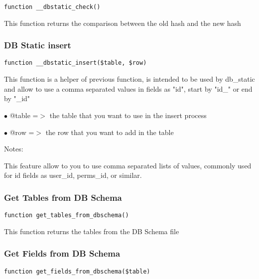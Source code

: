\documentclass[a4paper]{article}
\begin{document}
\begin{lstlisting}
function __dbstatic_check()
\end{lstlisting}

This function returns the comparison between the old hash and the new hash

\hypertarget{toc414}{}
\subsubsection{DB Static insert}

\begin{lstlisting}
function __dbstatic_insert($table, $row)
\end{lstlisting}

This function is a helper of previous function, is intended to be used by db\_static and
allow to use a comma separated values in fields as "id", start by "id\_" or end by "\_id"

\begin{compactitem}
\item[\color{myblue}$\bullet$] @table =$>$ the table that you want to use in the insert process
\item[\color{myblue}$\bullet$] @row   =$>$ the row that you want to add in the table
\end{compactitem}

Notes:

This feature allow to you to use comma separated lists of values, commonly used for id
fields as user\_id, perms\_id, or similar.

\hypertarget{toc415}{}
\subsubsection{Get Tables from DB Schema}

\begin{lstlisting}
function get_tables_from_dbschema()
\end{lstlisting}

This function returns the tables from the DB Schema file

\hypertarget{toc416}{}
\subsubsection{Get Fields from DB Schema}

\begin{lstlisting}
function get_fields_from_dbschema($table)
\end{lstlisting}
\end{document}
